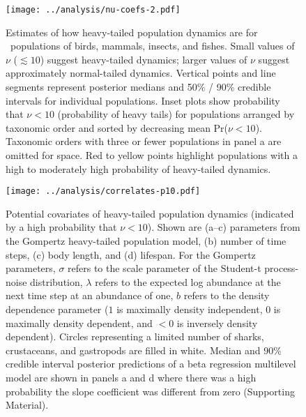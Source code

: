 \clearpage

\begin{figure}[htbp]
\begin{center}
\texttt{[image: ../analysis/nu-coefs-2.pdf]}
\caption{
Estimates of how heavy-tailed population dynamics are for \nuCoefPopN\
populations of birds, mammals, insects, and fishes. Small values of $\nu$
($\lesssim 10$) suggest heavy-tailed dynamics; larger values of $\nu$ suggest
approximately normal-tailed dynamics. Vertical points and line segments
represent posterior medians and 50\% / 90\% credible intervals for individual
populations. Inset plots show probability that $\nu < 10$ (probability of
heavy tails) for populations arranged by taxonomic order and sorted by
decreasing mean Pr($\nu < 10$). Taxonomic orders with three or fewer
populations in panel a are omitted for space. Red to yellow points highlight
populations with a high to moderately high probability of heavy-tailed dynamics.
} \label{fig:nu-coefs} \end{center} \end{figure}

\clearpage

\begin{figure}[htbp]
\begin{center}
\texttt{[image: ../analysis/correlates-p10.pdf]}
\caption{
Potential covariates of heavy-tailed population dynamics (indicated by a high
probability that $\nu < 10$). Shown are (a--c) parameters from the Gompertz
heavy-tailed population model, (b) number of time steps, (c) body length, and
(d) lifespan. For the Gompertz parameters, $\sigma$ refers to the scale
parameter of the Student-t process-noise distribution, $\lambda$ refers to the
expected log abundance at the next time step at an abundance of one, $b$
refers to the density dependence parameter ($1$ is maximally density
independent, $0$ is maximally density dependent, and $<0$ is inversely density
dependent).
Circles representing a limited number of sharks, crustaceans, and gastropods
are filled in white. Median and 90\% credible interval posterior predictions of
a beta regression multilevel model are shown in panels a and d where there was
a high probability the slope coefficient was different from zero (Supporting
Material).
}
\label{fig:correlates}
\end{center}
\end{figure}
